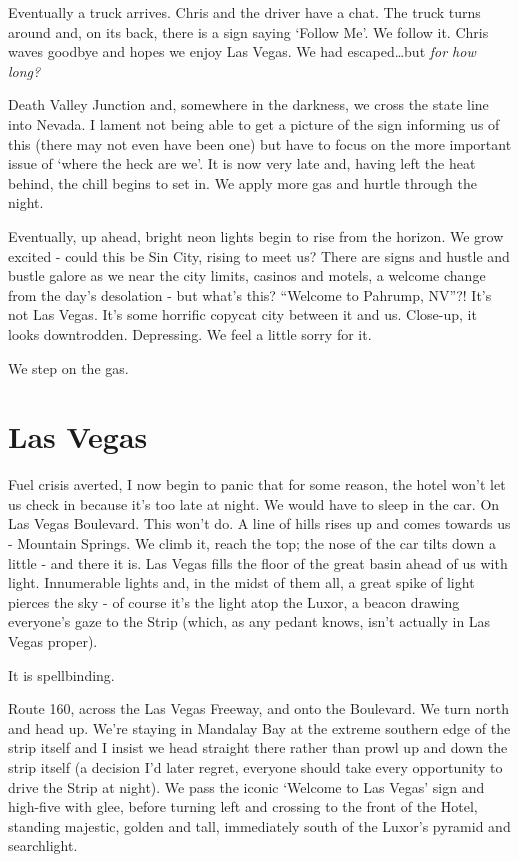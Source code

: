 \documentclass[a5paper,titlepage,draft]{book}
\begin{document}
Eventually a truck arrives.  Chris and the driver have a chat.  The truck turns around and, on its back, there is a sign saying `Follow Me'.  We follow it.  Chris waves goodbye and hopes we enjoy Las Vegas.  We had escaped\ldots but \emph{for how long?}

Death Valley Junction and, somewhere in the darkness, we cross the state line into Nevada.  I lament not being able to get a picture of the sign informing us of this (there may not even have been one) but have to focus on the more important issue of `where the heck are we'.  It is now very late and, having left the heat behind, the chill begins to set in.  We apply more gas and hurtle through the night.

Eventually, up ahead, bright neon lights begin to rise from the horizon.  We grow excited - could this be Sin City, rising to meet us?  There are signs and hustle and bustle galore as we near the city limits, casinos and motels, a welcome change from the day's desolation - but what's this?  ``Welcome to Pahrump, NV''?!  It's not Las Vegas.  It's some horrific copycat city between it and us.  Close-up, it looks downtrodden.  Depressing.  We feel a little sorry for it.

We step on the gas.

\section*{Las Vegas}
Fuel crisis averted, I now begin to panic that for some reason, the hotel won't let us check in because it's too late at night.  We would have to sleep in the car.  On Las Vegas Boulevard.  This won't do.  A line of hills rises up and comes towards us - Mountain Springs.  We climb it, reach the top; the nose of the car tilts down a little - and there it is.  Las Vegas fills the floor of the great basin ahead of us with light.  Innumerable lights and, in the midst of them all, a great spike of light pierces the sky - of course it's the light atop the Luxor, a beacon drawing everyone's gaze to the Strip (which, as any pedant knows, isn't actually in Las Vegas proper).

It is spellbinding.

Route 160, across the Las Vegas Freeway, and onto the Boulevard.  We turn north and head up.  We're staying in Mandalay Bay at the extreme southern edge of the strip itself and I insist we head straight there rather than prowl up and down the strip itself (a decision I'd later regret, everyone should take every opportunity to drive the Strip at night).  We pass the iconic `Welcome to Las Vegas' sign and high-five with glee, before turning left and crossing to the front of the Hotel, standing majestic, golden and tall, immediately south of the Luxor's pyramid and searchlight.
\end{document}
